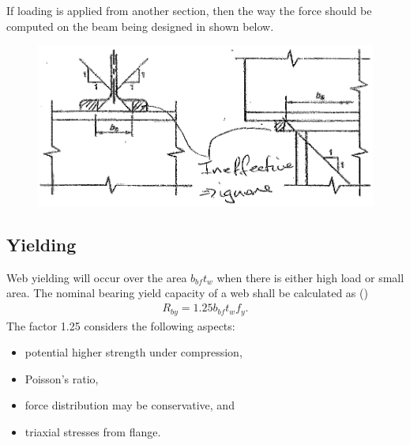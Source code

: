 If loading is applied from another section, then the way the force should be computed on the beam being designed in shown below.
\begin{figure}[H]
\centering\includegraphics{PIC/CH05/BEARO}
\end{figure}
\subsection{Yielding}
Web yielding will occur over the area $b_{bf}t_w$ when there is either high load or small area. The nominal bearing yield capacity of a web shall be calculated as ()
\begin{gather}
R_{by}=1.25b_{bf}t_wf_y.
\end{gather}
The factor \num{1.25} considers the following aspects:
\begin{itemize}
\item potential higher strength under compression,
\item Poisson's ratio,
\item force distribution may be conservative, and
\item triaxial stresses from flange.
\end{itemize}
